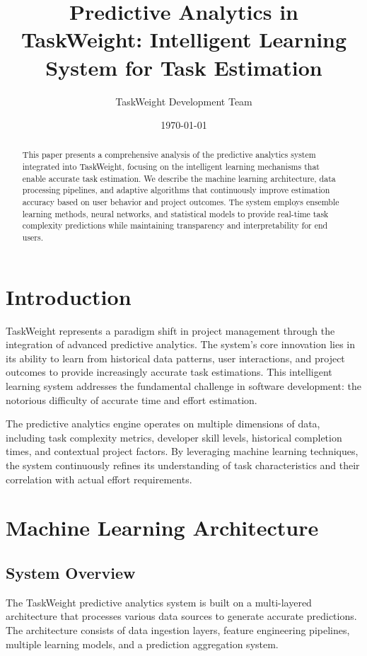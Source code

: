 \documentclass[12pt,a4paper]{article}
\title{Predictive Analytics in TaskWeight: Intelligent Learning System for Task Estimation}
\author{TaskWeight Development Team}
\date{\today}
\begin{document}
\maketitle

\begin{abstract}
This paper presents a comprehensive analysis of the predictive analytics system integrated into TaskWeight, focusing on the intelligent learning mechanisms that enable accurate task estimation. We describe the machine learning architecture, data processing pipelines, and adaptive algorithms that continuously improve estimation accuracy based on user behavior and project outcomes. The system employs ensemble learning methods, neural networks, and statistical models to provide real-time task complexity predictions while maintaining transparency and interpretability for end users.
\end{abstract}

\section{Introduction}

TaskWeight represents a paradigm shift in project management through the integration of advanced predictive analytics. The system's core innovation lies in its ability to learn from historical data patterns, user interactions, and project outcomes to provide increasingly accurate task estimations. This intelligent learning system addresses the fundamental challenge in software development: the notorious difficulty of accurate time and effort estimation.

The predictive analytics engine operates on multiple dimensions of data, including task complexity metrics, developer skill levels, historical completion times, and contextual project factors. By leveraging machine learning techniques, the system continuously refines its understanding of task characteristics and their correlation with actual effort requirements.

\section{Machine Learning Architecture}

\subsection{System Overview}

The TaskWeight predictive analytics system is built on a multi-layered architecture that processes various data sources to generate accurate predictions. The architecture consists of data ingestion layers, feature engineering pipelines, multiple learning models, and a prediction aggregation system.
\end{document}
